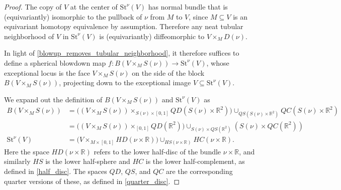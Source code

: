 \documentclass[11pt]{amsart}
\theoremstyle{definition}
\newtheorem{notn}{Notation}[section]
\numberwithin{equation}{section}
\numberwithin{figure}{section}
\newcommand{\R}{\mathbb R}
\newcommand{\St}{\mathrm{St}}
\begin{document}
\begin{proof}
	The copy of $V$ at the center of $\St^\nu(V)$ has normal bundle that is (equivariantly) isomorphic to the pullback of $\nu$ from $M$ to $V$, since $M \subseteq V$ is an equivariant homotopy equivalence by assumption. Therefore any neat tubular neighborhood of $V$ in $\St^\nu(V)$ is (equivariantly) diffeomorphic to $V \times_M D(\nu)$.
	
	In light of \autoref{blowup_removes_tubular_neighborhood}, it therefore suffices to define a spherical blowdown map $f\colon B(V \times_M S(\nu)) \to \St^\nu(V)$, whose exceptional locus is the face $V \times_M S(\nu)$ on the side of the block $B(V \times_M S(\nu))$, projecting down to the exceptional image $V \subseteq \St^\nu(V)$.
	
	We expand out the definition of $B(V \times_M S(\nu))$ and $\St^\nu(V)$ as
	\begin{align*}
		B(V \times_M S(\nu)) &= \big( (V \times_M S(\nu)) \times_{S(\nu) \times [0,1]} QD(S(\nu) \times \R^2) \big) \cup_{QS(S(\nu) \times \R^2)} QC(S(\nu) \times \R^2) \\
		&= \big( (V \times_M S(\nu)) \times_{[0,1]} QD(\R^2) \big) \cup_{S(\nu) \times QS(\R^2)} (S(\nu) \times QC(\R^2)) \\
		\St^\nu(V) &= \big( V \times_{M \times [0,1]} HD(\nu \times \R) \big) \cup_{HS(\nu \times \R)} HC(\nu \times \R).
	\end{align*}
	Here the space $HD(\nu \times \R)$ refers to the lower half-disc of the bundle $\nu \times \R$, and similarly $HS$ is the lower half-sphere and $HC$ is the lower half-complement, as defined in \autoref{half_disc}.
The spaces $QD$, $QS$, and $QC$ are the corresponding quarter versions of these, as defined in \autoref{quarter_disc}.
%	

\end{proof}
\end{document}
